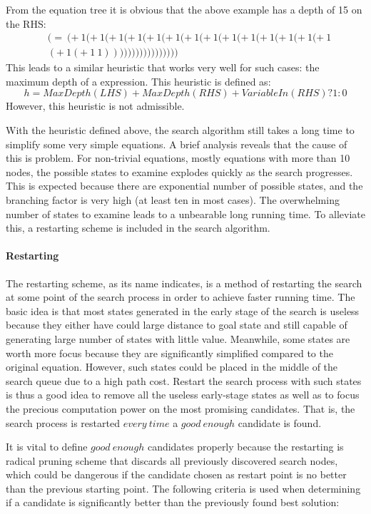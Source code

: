 \documentclass{article}
\begin{document}
From the equation tree it is obvious that the above example has a depth of 15 on the RHS:
\[ 
\begin{split}
&(=~(+~1(+~1(+~1(+~1(+~1(+~1(+~1(+~1(+~1(+~1(+~1(+~1(+~1(+~1\\
&(+~1(+~1~1)))))))))))))))))
\end{split} \]
This leads to a similar heuristic that works very well for such cases: the maximum depth of a expression. This heuristic is defined as:
\[ h = MaxDepth(LHS) + MaxDepth(RHS) + VariableIn(RHS)?1:0 \]
However, this heuristic is not admissible.

\bigbreak
\bigbreak
With the heuristic defined above, the search algorithm still takes a long time to simplify some very simple equations. A brief analysis reveals that the cause of this is problem. For non-trivial equations, mostly equations with more than 10 nodes, the possible states to examine explodes quickly as the search progresses. This is expected because there are exponential number of possible states, and the branching factor is very high (at least ten in most cases). The overwhelming number of states to examine leads to a unbearable long running time. To alleviate this, a restarting scheme is included in the search algorithm.

\paragraph{Restarting} The restarting scheme, as its name indicates, is a method of restarting the search at some point of the search process in order to achieve faster running time. The basic idea is that most states generated in the early stage of the search is useless because they either have could large distance to goal state and still capable of generating large number of states with little value. Meanwhile, some states are worth more focus because they are significantly simplified compared to the original equation. However, such states could be placed in the middle of the search queue due to a high path cost. Restart the search process with such states is thus a good idea to remove all the useless early-stage states as well as to focus the precious computation power on the most promising candidates. That is, the search process is restarted $every~time$ a $good~enough$ candidate is found.

It is vital to define $good~enough$ candidates properly because the restarting is radical pruning scheme that discards all previously discovered search nodes, which could be dangerous if the candidate chosen as restart point is no better than the previous starting point. The following criteria is used when determining if a candidate is significantly better than the previously found best solution:
\end{document}
